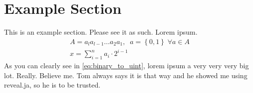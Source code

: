 \documentclass{article}
\begin{document}
\section{Example Section}
This is an example section. Please see it as such. Lorem ipsum. 
\begin{gather}\label{eq:binary_to_uint}
A = a_l a_{l-1} \dots a_2 a_1,\;\; a = \left\{0, 1\right\} \; \forall a \in A \nonumber \\
x = \sum\limits_{i=1}^n a_i \cdot 2^{i-1}
\end{gather}
As you can clearly see in \ref{eq:binary_to_uint}, lorem ipsum a very very very big lot. Really. Believe me. Tom always says it is that way and he showed me using reveal.ja, so he is to be trusted. 
\end{document}
